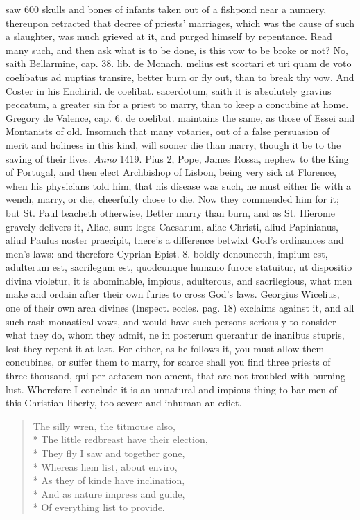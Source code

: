 {saw 600 skulls and bones of infants taken out of a fishpond near a
nunnery, thereupon retracted that decree of priests' marriages, which
was the cause of such a slaughter, was much grieved at it, and purged
himself by repentance. Read many such, and then ask what is to be done,
is this vow to be broke or not? No, saith Bellarmine, cap. 38. lib. de
Monach. melius est scortari et uri quam de voto coelibatus ad nuptias
transire, better burn or fly out, than to break thy vow. And Coster in
his Enchirid. de coelibat. sacerdotum, saith it is absolutely gravius
peccatum, a greater sin for a priest to marry, than to keep a
concubine at home. Gregory de Valence, cap. 6. de coelibat. maintains
the same, as those of Essei and Montanists of old. Insomuch that many
votaries, out of a false persuasion of merit and holiness in this kind,
will sooner die than marry, though it be to the saving of their lives.
\emph{Anno} 1419. Pius 2, Pope, James Rossa, nephew to the King of
Portugal, and then elect Archbishop of Lisbon, being very sick at
Florence, when his physicians told him, that his disease was
such, he must either lie with a wench, marry, or die, cheerfully chose
to die. Now they commended him for it; but St. Paul teacheth otherwise,
Better marry than burn, and as St. Hierome gravely delivers it, Aliae,
sunt leges Caesarum, aliae Christi, aliud Papinianus, aliud Paulus
noster praecipit, there's a difference betwixt God's ordinances and
men's laws: and therefore Cyprian Epist. 8. boldly denounceth, impium
est, adulterum est, sacrilegum est, quodcunque humano furore statuitur,
ut dispositio divina violetur, it is abominable, impious, adulterous,
and sacrilegious, what men make and ordain after their own furies to
cross God's laws. Georgius Wicelius, one of their own arch
divines (Inspect. eccles. pag. 18) exclaims against it, and all such
rash monastical vows, and would have such persons seriously to consider
what they do, whom they admit, ne in posterum querantur de inanibus
stupris, lest they repent it at last. For either, as he follows it,
you must allow them concubines, or suffer them to marry, for
scarce shall you find three priests of three thousand, qui per aetatem
non ament, that are not troubled with burning lust. Wherefore I
conclude it is an unnatural and impious thing to bar men of this
Christian liberty, too severe and inhuman an edict.

{\gothfont
\begin{verse}
The silly wren, the titmouse also,\\*
The little redbreast have their election,\\*
They fly I saw and together gone,\\*
Whereas hem list, about enviro,\\*
As they of kinde have inclination,\\*
And as nature impress and guide,\\*
Of everything list to provide.


\end{verse}}}
